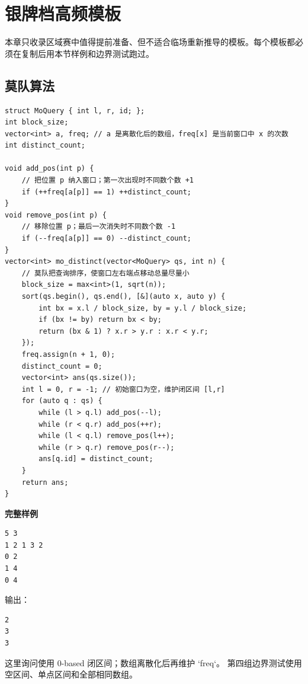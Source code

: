 \chapter{银牌档高频模板}

本章只收录区域赛中值得提前准备、但不适合临场重新推导的模板。每个模板都必须在复制后用本节样例和边界测试跑过。

\section{莫队算法}


\begin{lstlisting}[style=cpp]
struct MoQuery { int l, r, id; };
int block_size;
vector<int> a, freq; // a 是离散化后的数组，freq[x] 是当前窗口中 x 的次数
int distinct_count;

void add_pos(int p) {
    // 把位置 p 纳入窗口；第一次出现时不同数个数 +1
    if (++freq[a[p]] == 1) ++distinct_count;
}
void remove_pos(int p) {
    // 移除位置 p；最后一次消失时不同数个数 -1
    if (--freq[a[p]] == 0) --distinct_count;
}
vector<int> mo_distinct(vector<MoQuery> qs, int n) {
    // 莫队把查询排序，使窗口左右端点移动总量尽量小
    block_size = max<int>(1, sqrt(n));
    sort(qs.begin(), qs.end(), [&](auto x, auto y) {
        int bx = x.l / block_size, by = y.l / block_size;
        if (bx != by) return bx < by;
        return (bx & 1) ? x.r > y.r : x.r < y.r;
    });
    freq.assign(n + 1, 0);
    distinct_count = 0;
    vector<int> ans(qs.size());
    int l = 0, r = -1; // 初始窗口为空，维护闭区间 [l,r]
    for (auto q : qs) {
        while (l > q.l) add_pos(--l);
        while (r < q.r) add_pos(++r);
        while (l < q.l) remove_pos(l++);
        while (r > q.r) remove_pos(r--);
        ans[q.id] = distinct_count;
    }
    return ans;
}
\end{lstlisting}

\begin{card}
\textbf{完整样例}\\
\begin{lstlisting}
5 3
1 2 1 3 2
0 2
1 4
0 4
\end{lstlisting}
输出：
\begin{lstlisting}
2
3
3
\end{lstlisting}
这里询问使用 0-based 闭区间；数组离散化后再维护 `freq`。
第四组边界测试使用空区间、单点区间和全部相同数组。
\end{card}

